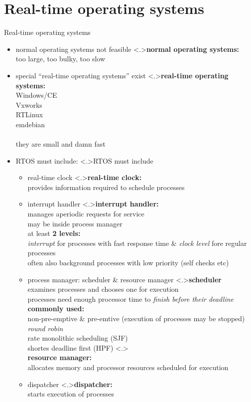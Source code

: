 \documentclass[ngerman={babel}, utf8, bigger, t, xcolor={table,dvipsnames}, ompress, hyperref={bookmarks,colorlinks},red]{beamer}
\begin{document}
\section{Real-time operating systems}
\begin{frame}{Real-time operating systems}
	\begin{itemize}
		\item normal operating systems not feasible
		\note<.>{\textbf{normal operating systems:}\\ too large, too bulky, too slow}
		\item special ``real-time operating systems'' exist
		\note<.>{\textbf{real-time operating systems:}\\Windows/CE \\ Vxworks \\ RTLinux \\ emdebian\\ \ \\ they are small and damn fast}
		\item RTOS must include:
		\note<.>{RTOS must include}
		\begin{itemize}
			\item real-time clock
			\note<.>{\textbf{real-time clock:}\\ provides information required to schedule processes}
			\item interrupt handler
			\note<.>{\textbf{interrupt handler:}\\ manages aperiodic requests for service \\ may be inside process manager \\ at least \textbf{2 levels:} \\ \emph{interrupt} for processes with fast response time \& \emph {clock level} fore regular processes \\ often also background processes with low priority {\tiny (self checks etc)}}
			\item process manager: scheduler \& resource manager
			\note<.>{\textbf{scheduler}\\ examines processes and chooses one for execution \\ processes need enough processor time to \emph{finish before their deadline} \\ \textbf{commonly used:} \\ non-pre-emptive \& pre-emtive (execution of processes may be stopped) \\ \emph{round robin} \\ rate monolithic scheduling (SJF) \\ shortes deadline first (HPF) }
			\note<.>{\\ \textbf{resource manager:}\\ allocates memory and processor resources scheduled for execution}
			\item dispatcher
			\note<.>{\textbf{dispatcher:}\\ starts execution of processes}
		\end{itemize}
	\end{itemize}
\end{frame}
\end{document}
